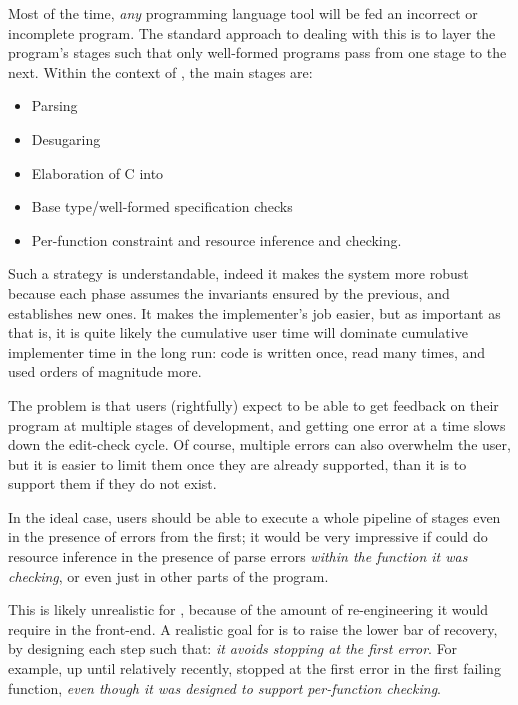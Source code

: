 Most of the time, \emph{any} programming language tool will be fed an incorrect
or incomplete program. The standard approach to dealing with this is to layer
the program's stages such that only well-formed programs pass from one stage to
the next. Within the context of , the main stages are:
\begin{itemize}
    \item Parsing
    \item Desugaring
    \item Elaboration of C into 
    \item Base type/well-formed specification checks
    \item Per-function constraint and resource inference and checking.
\end{itemize}

Such a strategy is understandable, indeed it makes the system more robust
because each phase assumes the invariants ensured by the previous, and
establishes new ones. It makes the implementer's job easier, but as important
as that is, it is quite likely the cumulative user time will dominate
cumulative implementer time in the long run: code is written once, read many
times, and used orders of magnitude more.

The problem is that users (rightfully) expect to be able to get feedback on
their program at multiple stages of development, and getting one error at a
time slows down the edit-check cycle. Of course, multiple errors can also
overwhelm the user, but it is easier to limit them once they are already
supported, than it is to support them if they do not exist.

In the ideal case, users should be able to execute a whole pipeline of stages
even in the presence of errors from the first; it would be very impressive if
 could do resource inference in the presence of parse errors
\emph{within the function it was checking}, or even just in other parts of the
program.

This is likely unrealistic for , because of the amount of re-engineering
it would require in the  front-end. A realistic goal for 
is to raise the lower bar of recovery, by designing each step such that:
\emph{it avoids stopping at the first error}. For example, up until relatively
recently,  stopped at the first error in the first failing function,
\emph{even though it was designed to support per-function checking}.

